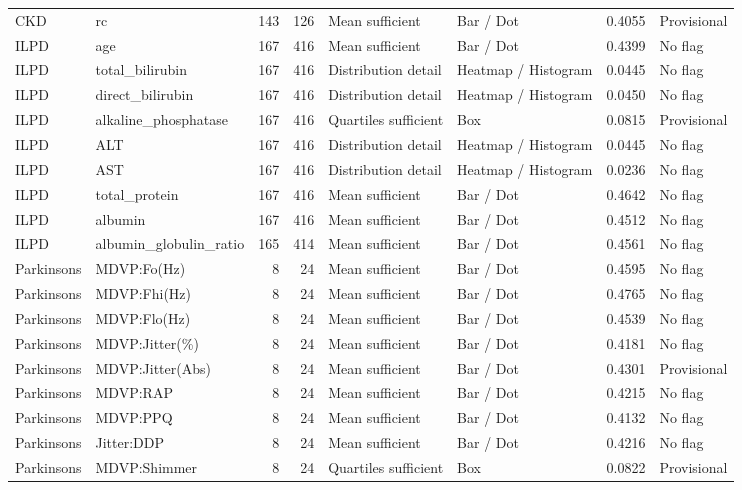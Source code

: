 \begin{longtable}{>{\raggedright\arraybackslash}p{2.5cm}>{\raggedright\arraybackslash}p{4.5cm}rr>{\raggedright\arraybackslash}p{3.0cm}>{\raggedright\arraybackslash}p{4.0cm}rp{2.0cm}}
CKD\cite{kidney} & rc & 143 & 126 & Mean sufficient & Bar / Dot & 0.4055 & Provisional\\
ILPD\cite{liver} & age & 167 & 416 & Mean sufficient & Bar / Dot & 0.4399 & No flag\\
ILPD\cite{liver} & total\_bilirubin & 167 & 416 & Distribution detail & Heatmap / Histogram & 0.0445 & No flag\\
ILPD\cite{liver} & direct\_bilirubin & 167 & 416 & Distribution detail & Heatmap / Histogram & 0.0450 & No flag\\
ILPD\cite{liver} & alkaline\_phosphatase & 167 & 416 & Quartiles sufficient & Box & 0.0815 & Provisional\\
ILPD\cite{liver} & ALT & 167 & 416 & Distribution detail & Heatmap / Histogram & 0.0445 & No flag\\
ILPD\cite{liver} & AST & 167 & 416 & Distribution detail & Heatmap / Histogram & 0.0236 & No flag\\
ILPD\cite{liver} & total\_protein & 167 & 416 & Mean sufficient & Bar / Dot & 0.4642 & No flag\\
ILPD\cite{liver} & albumin & 167 & 416 & Mean sufficient & Bar / Dot & 0.4512 & No flag\\
ILPD\cite{liver} & albumin\_globulin\_ratio & 165 & 414 & Mean sufficient & Bar / Dot & 0.4561 & No flag\\
Parkinsons\cite{parkinsons} & MDVP:Fo(Hz) & 8 & 24 & Mean sufficient & Bar / Dot & 0.4595 & No flag\\
Parkinsons\cite{parkinsons} & MDVP:Fhi(Hz) & 8 & 24 & Mean sufficient & Bar / Dot & 0.4765 & No flag\\
Parkinsons\cite{parkinsons} & MDVP:Flo(Hz) & 8 & 24 & Mean sufficient & Bar / Dot & 0.4539 & No flag\\
Parkinsons\cite{parkinsons} & MDVP:Jitter(\%) & 8 & 24 & Mean sufficient & Bar / Dot & 0.4181 & No flag\\
Parkinsons\cite{parkinsons} & MDVP:Jitter(Abs) & 8 & 24 & Mean sufficient & Bar / Dot & 0.4301 & Provisional\\
Parkinsons\cite{parkinsons} & MDVP:RAP & 8 & 24 & Mean sufficient & Bar / Dot & 0.4215 & No flag\\
Parkinsons\cite{parkinsons} & MDVP:PPQ & 8 & 24 & Mean sufficient & Bar / Dot & 0.4132 & No flag\\
Parkinsons\cite{parkinsons} & Jitter:DDP & 8 & 24 & Mean sufficient & Bar / Dot & 0.4216 & No flag\\
Parkinsons\cite{parkinsons} & MDVP:Shimmer & 8 & 24 & Quartiles sufficient & Box & 0.0822 & Provisional\\

\end{longtable}
